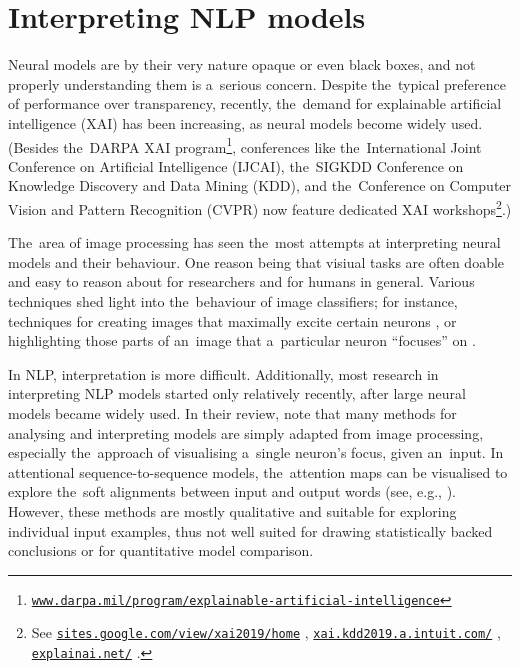 \documentclass[bsc,frontabs,singlespacing,parskip,deptreport]{infthesis}
\newcommand\rurl[1]{%
  \href{https://#1}{\nolinkurl{#1}}%
}
\begin{document}
{  \section{Interpreting NLP models}{
    \label{sec:understanding-models}
    Neural models are by their very nature opaque or even black boxes, and not properly understanding them is a~serious concern.
    Despite the~typical preference of performance over transparency, recently, the~demand for explainable artificial intelligence (XAI) has been increasing, as neural models become widely used. (Besides the~DARPA XAI program\footnote{\rurl{www.darpa.mil/program/explainable-artificial-intelligence}}, conferences like the~International Joint Conference on Artificial Intelligence (IJCAI), the~SIGKDD Conference on Knowledge Discovery and Data Mining (KDD), and the~Conference on Computer Vision and Pattern Recognition (CVPR) now feature dedicated XAI workshops\footnote{See \rurl{sites.google.com/view/xai2019/home}, \rurl{xai.kdd2019.a.intuit.com/}, \rurl{explainai.net/}.}.)

    The~area of image processing has seen the~most attempts at interpreting neural models and their behaviour. One reason being that visiual tasks are often doable and easy to reason about for researchers and for humans in general. Various techniques shed light into the~behaviour of image classifiers; for instance, techniques for creating images that maximally excite certain neurons \citep{Simonyan_2013}, or highlighting those parts of an~image that a~particular neuron ``focuses'' on \citep{Zeiler_2013}. 
    
    In NLP, interpretation is more difficult. Additionally, most research in interpreting NLP models started only relatively recently, after large neural models became widely used.
    In their review, \citet{Belinkov_2018} note that many methods for analysing and interpreting models are simply adapted from image processing, especially the~approach of visualising a~single neuron's focus, given an~input.
    In attentional sequence-to-sequence models, the~attention maps can be visualised to explore the~soft alignments between input and output words (see, e.g., \citet{Strobelt_2018}). However, these methods are mostly qualitative and suitable for exploring individual input examples, thus not well suited for drawing statistically backed conclusions or for quantitative model comparison.
    
}}
\end{document}
